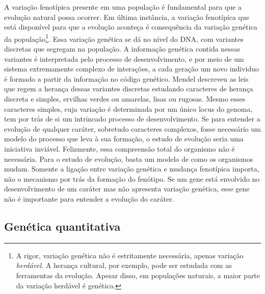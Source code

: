 \begin{refsection}
A variação fenotípica presente em uma população é fundamental para que a
evolução natural possa ocorrer. Em última instância, a variação fenotípica que
está disponível para que a evolução aconteça é consequência da variação
genética da população\footnote{A rigor, variação genética não é estritamente
necessária, apenas variação \textit{herdável}. A herança cultural, por
exemplo, pode ser estudada com as ferramentas da evolução. Apesar disso, em
populações naturais, a maior parte da variação herdável é genética.}. Essa
variação genética se dá no nível do DNA, com variantes discretas que segregam
na população. A informação genética contida nessas variantes é interpretada
pelo processo de desenvolvimento, e por meio de um sistema extremamente
complexo de interações, a cada geração um novo individuo é formado a partir da
informação no código genético. Mendel descreveu as leis que regem a herança
dessas variantes discretas estudando caracteres de herança discreta e simples,
ervilhas verdes ou amarelas, lisas ou rugosas. Mesmo esses caracteres simples,
cuja variação é determinada por um único locus do genoma, tem por trás de si
um intrincado processo de desenvolvimento. Se para entender a evolução de
qualquer caráter, sobretudo caracteres complexos, fosse necessário um modelo
do processo que leva à sua formação, o estudo de evolução seria uma iniciativa
inviável. Felizmente, essa compreensão total do organismo não é necessária.
Para o estudo de evolução, basta um modelo de como os organismos mudam.
Somente a ligação entre variação genética e mudança fenotípica importa, não o
mecanismo por trás da formação do fenótipo. Se um gene está envolvido no
desenvolvimento de um caráter mas não apresenta variação genética, esse gene
não é importante para entender a evolução do caráter.

\subsection{Genética quantitativa} 


\end{refsection}
